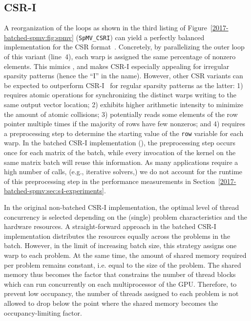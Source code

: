 \subsection{CSR-I}

A reorganization of the \spmv loops
as shown in the third listing of Figure~\ref{2017-batched-spmv:fig:spmv} ({\tt SpMV\_CSRI})
can yield a perfectly balanced implementation for the CSR format~\cite{csri}.
Concretely, by parallelizing the outer loop of this variant (line~4),
each warp is assigned the same percentage of nonzero elements.
This mimics \coo, 
and makes CSR-I especially appealing for irregular sparsity patterns
(hence the ``I'' in the name).
However, other CSR variants can be expected to outperform 
CSR-I~\cite{csri} for regular sparsity patterns as the latter:
1) requires atomic operations for synchronizing the distinct warps writing to the same 
output vector location;
2) exhibits higher arithmetic intensity to minimize the amount of atomic collisions; 
3) potentially reads some elements of the row pointer multiple times
if the majority of rows have few nonzeros;
and 4) requires a preprocessing step to determine the starting value of the \texttt{row} variable for each warp.
In the batched CSR-I implementation (\csri), the preprocessing
step occurs once for each matrix of the batch, 
while every invocation of the \csri kernel on the same matrix batch will reuse this information. 
As many applications require a high number of \spmv calls, (e.g., iterative solvers,)
we do not account for the runtime of this preprocessing step in 
the performance measurements in Section~\ref{2017-batched-spmv:sec:s4-experiments}.

In the original non-batched CSR-I implementation, the optimal level of thread
concurrency is selected depending on the (single) problem characteristics and the hardware resources.
A straight-forward approach in the batched CSR-I implementation 
distributes the resources equally across the problems in the batch.
However, in the limit of increasing batch size, this strategy assigns one warp to each problem.
At the same time, the amount of shared memory required per problem remains constant,
i.e. equal to the size of the problem.
The shared memory thus becomes the factor that constrains the number of
thread blocks which can run concurrently on each multiprocessor of the GPU.
Therefore, to prevent low occupancy, the number of threads assigned to each
problem is not allowed to drop below the point where the shared memory becomes the 
occupancy-limiting factor.

